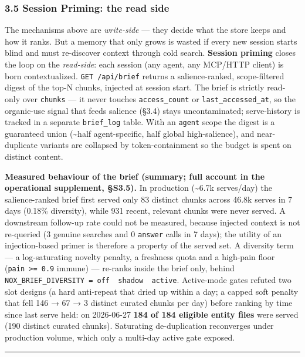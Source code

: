 \documentclass[
]{article}
\begin{document}
\subsubsection{3.5 Session Priming: the read
side}\label{session-priming-the-read-side}

The mechanisms above are \emph{write-side} --- they decide what the
store keeps and how it ranks. But a memory that only grows is wasted if
every new session starts blind and must re-discover context through cold
search. \textbf{Session priming} closes the loop on the
\emph{read-side}: each session (any agent, any MCP/HTTP client) is born
contextualized. \texttt{GET\ /api/brief} returns a salience-ranked,
scope-filtered digest of the top-N chunks, injected at session start.
The brief is strictly read-only over \texttt{chunks} --- it never
touches \texttt{access\_count} or \texttt{last\_accessed\_at}, so the
organic-use signal that feeds salience (§3.4) stays uncontaminated;
serve-history is tracked in a separate \texttt{brief\_log} table. With
an \texttt{agent} scope the digest is a guaranteed union
(\textasciitilde half agent-specific, half global high-salience), and
near-duplicate variants are collapsed by token-containment so the budget
is spent on distinct content.

\textbf{Measured behaviour of the brief (summary; full account in the
operational supplement, §S3.5).} In production (\textasciitilde6.7k
serves/day) the salience-ranked brief first served only 83 distinct
chunks across 46.8k serves in 7 days (0.18\% diversity), while 931
recent, relevant chunks were never served. A downstream follow-up rate
could not be measured, because injected context is not re-queried (3
genuine searches and 0 \texttt{answer} calls in 7 days); the utility of
an injection-based primer is therefore a property of the served set. A
diversity term --- a log-saturating novelty penalty, a freshness quota
and a high-pain floor (\texttt{pain\ \textgreater{}=\ 0.9} immune) ---
re-ranks inside the brief only, behind
\texttt{NOX\_BRIEF\_DIVERSITY\ =\ off\ \textbar{}\ shadow\ \textbar{}\ active}.
Active-mode gates refuted two slot designs (a hard anti-repeat that
dried up within a day; a capped soft penalty that fell 146 → 67 → 3
distinct curated chunks per day) before ranking by time since last serve
held: on 2026-06-27 \textbf{184 of 184 eligible entity files} were
served (190 distinct curated chunks). Saturating de-duplication
reconverges under production volume, which only a multi-day active gate
exposed.

\begin{center}\rule{0.5\linewidth}{0.5pt}\end{center}
\end{document}
